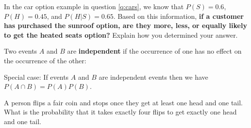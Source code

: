 \bb[resume]
\ii In the car option example in question \ref{q:cars}, we know that  $P(S) = 0.6$, $P(H) = 0.45$, and $P(H | S ) = 0.65$. Based on this information, \textbf{if a customer has purchased the sunroof option, are they more, less, or equally likely to get the heated seats option?} Explain how you determined your answer.

\vfill


\ee

\bbox
\begin{definition}\label{def:ind}
Two events $A$ and $B$ are \textbf{\alert{independent}} if the occurrence of one has no effect on the occurrence of the other:

\vspace{0.5in}

\alert{Special case:} If events $A$ and $B$ are independent events then we have $P(A \cap B) = P(A)P(B)$.
\end{definition}
\ebox

\bb[resume]

\ii A person flips a fair coin and stops once they get at least one head and one tail. What is the probability that it takes exactly four flips to get exactly one head and one tail.

\vfill

\ee

\clearpage




